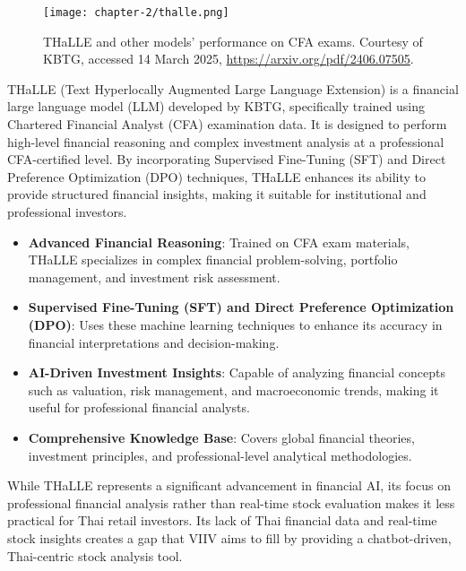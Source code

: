 \begin{figure}[h]
    \centering
    \texttt{[image: chapter-2/thalle.png]}
    \caption[THaLLE and other models' performance on CFA exams]{THaLLE and other models' performance on CFA exams. Courtesy of KBTG, accessed 14 March 2025, \url{https://arxiv.org/pdf/2406.07505}.}
    \label{fig:thalle}
\end{figure}

\FloatBarrier

THaLLE (Text Hyperlocally Augmented Large Language Extension) is a financial large language model (LLM) developed by KBTG, specifically trained using Chartered Financial Analyst (CFA) examination data.
It is designed to perform high-level financial reasoning and complex investment analysis at a professional CFA-certified level. By incorporating Supervised Fine-Tuning (SFT) and Direct Preference Optimization (DPO) techniques, 
THaLLE enhances its ability to provide structured financial insights, making it suitable for institutional and professional investors.

\begin{itemize}[leftmargin=60pt]
    \item \textbf{Advanced Financial Reasoning}: Trained on CFA exam materials, THaLLE specializes in complex financial problem-solving, portfolio management, and investment risk assessment.
    \item \textbf{Supervised Fine-Tuning (SFT) and Direct Preference Optimization (DPO)}: Uses these machine learning techniques to enhance its accuracy in financial interpretations and decision-making.
    \item \textbf{AI-Driven Investment Insights}: Capable of analyzing financial concepts such as valuation, risk management, and macroeconomic trends, making it useful for professional financial analysts.
    \item \textbf{Comprehensive Knowledge Base}: Covers global financial theories, investment principles, and professional-level analytical methodologies.
\end{itemize}

While THaLLE represents a significant advancement in financial AI, its focus on professional financial analysis rather than real-time stock evaluation makes it less practical for Thai retail investors.
Its lack of Thai financial data and real-time stock insights creates a gap that VIIV aims to fill by providing a chatbot-driven, Thai-centric stock analysis tool\cite{THaLLEarXiv}.

